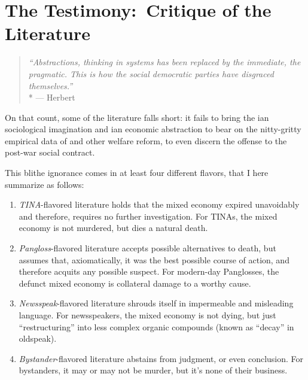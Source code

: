 
\section[Literature]{The Testimony:\ Critique of the Literature} \label{sec:Literature}

\begin{quote}
	\emph{``Abstractions, thinking in systems has been replaced by the immediate, the pragmatic.
	This is how the social democratic parties have disgraced themselves.''}
	\\*
	--- Herbert \citet[41]{Schui2009}
\end{quote}

On that count, some of the literature falls short:
it fails to bring the \citeauthor{Mills-1959-aa}ian sociological imagination and \citeauthor{Keynes1936}ian economic abstraction to bear on the nitty-gritty empirical data of  and other welfare reform, to even discern  the offense to the post-war social contract.

This blithe ignorance comes in at least four different flavors, that I here summarize as follows:
\begin{enumerate}
	\item \emph{TINA}-flavored literature holds that the mixed economy expired unavoidably and therefore, requires no further investigation.
For TINAs, the mixed economy is not murdered, but dies a natural death.
	\item \emph{Pangloss}-flavored literature accepts possible alternatives to death, but assumes that, axiomatically, it was the best possible course of action, and therefore acquits any possible suspect.
For modern-day Panglosses, the defunct mixed economy is collateral damage to a worthy cause.
	\item \emph{Newsspeak}-flavored literature shrouds itself in impermeable and misleading language.
For newsspeakers, the mixed economy is not dying, but just ``restructuring'' into less complex organic compounds (known as ``decay'' in oldspeak).
	\item \emph{Bystander}-flavored literature abstains from judgment, or even conclusion.
For bystanders, it may or may not be murder, but it's none of their business.
\end{enumerate}

